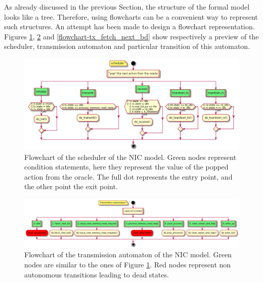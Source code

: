\documentclass{kththesis}
\begin{document}
{As already discussed in the previous Section, the structure of the formal model looks like a tree. Therefore, using flowcharts can be a convenient way to represent such structures. An attempt has been made to design a flowchart representation. Figures \ref{flowchart-scheduler}, \ref{flowchart-tx} and \ref{flowchart-tx_fetch_next_bd} show respectively a preview of the scheduler, transmission automaton and particular transition of this automaton.

\begin{figure}[h]
	\includegraphics[width=\textwidth]{figures/flowchart-scheduler.png}
	\centering
	\caption{Flowchart of the scheduler of the NIC model. Green nodes represent condition statements, here they represent the value of the popped action from the oracle. The full dot represents the entry point, and the other point the exit point.}
	\label{flowchart-scheduler}
\end{figure}

\begin{figure}[h]
	\includegraphics[width=\textwidth]{figures/flowchart-tx.png}
	\centering
	\caption{Flowchart of the transmission automaton of the NIC model. Green nodes are similar to the ones of Figure \ref{flowchart-scheduler}. Red nodes represent non autonomous transitions leading to dead states.}
	\label{flowchart-tx}
\end{figure}

}
\end{document}
